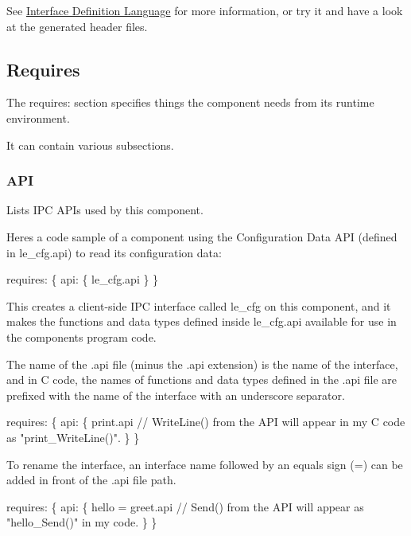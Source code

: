 See \hyperlink{interfaceDefLang}{Interface Definition Language} for more information, or try it and have a look at the generated header files.\hypertarget{def_files_cdef_defFilesCdef_requires}{}\subsection{Requires}\label{def_files_cdef_defFilesCdef_requires}
The {\ttfamily requires\+:} section specifies things the component needs from its runtime environment.

It can contain various subsections.\hypertarget{def_files_cdef_defFilesCdef_requiresApi}{}\subsubsection{A\+P\+I}\label{def_files_cdef_defFilesCdef_requiresApi}
Lists I\+P\+C A\+P\+Is used by this component.

Here\textquotesingle{}s a code sample of a component using the Configuration Data A\+P\+I (defined in le\+\_\+cfg.\+api) to read its configuration data\+:


\begin{DoxyCode}
requires:
\{
    api:
    \{
        le\_cfg.api
    \}
\}
\end{DoxyCode}


This creates a client-\/side I\+P\+C interface called {\ttfamily le\+\_\+cfg} on this component, and it makes the functions and data types defined inside {\ttfamily le\+\_\+cfg.\+api} available for use in the component\textquotesingle{}s program code.

The name of the {\ttfamily }.api file (minus the {\ttfamily }.api extension) is the name of the interface, and in C code, the names of functions and data types defined in the {\ttfamily }.api file are prefixed with the name of the interface with an underscore separator.


\begin{DoxyCode}
requires:
\{
    api:
    \{
        print.api \textcolor{comment}{// WriteLine() from the API will appear in my C code as "print\_WriteLine()".}
    \}
\}
\end{DoxyCode}


To rename the interface, an interface name followed by an equals sign (\textquotesingle{}=\textquotesingle{}) can be added in front of the {\ttfamily }.api file path.


\begin{DoxyCode}
requires:
\{
    api:
    \{
        hello = greet.api \textcolor{comment}{// Send() from the API will appear as "hello\_Send()" in my code.}
    \}
\}
\end{DoxyCode}



